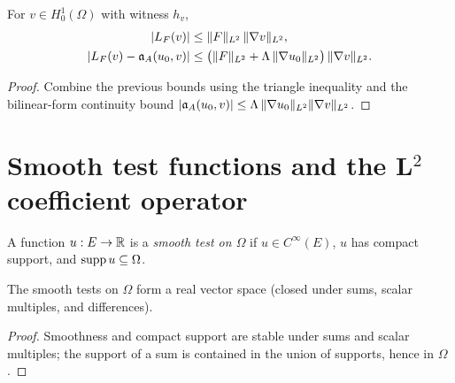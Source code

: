 \begin{lemma}
\label{lem:weakProblemRHSOfField_bound}
\leanok
{}
For $v \in H^{1}_{0}(\Omega)$ with witness $h_v$,
\begin{align*}
  |L_F(v)| &\leq \|F\|_{L^{2}} \,\|\nabla v\|_{L^{2}}, \\
  |L_F(v) - \mathfrak{a}_A(u_0, v)| &\leq \bigl(\|F\|_{L^{2}} + \Lambda\,\|\nabla u_0\|_{L^{2}}\bigr)\,\|\nabla v\|_{L^{2}}.
\end{align*}
\end{lemma}

\begin{proof}
\leanok
{}

Combine the previous bounds using the triangle inequality and the bilinear-form continuity bound $|\mathfrak{a}_A(u_0,v)| \leq \Lambda\,\|\nabla u_0\|_{L^{2}}\|\nabla v\|_{L^{2}}$.
\end{proof}

\section{Smooth test functions and the L\texorpdfstring{$^2$}{2} coefficient operator}

\begin{definition}
\label{def:IsSmoothTestOn}
\leanok
A function $u : E \to \mathbb{R}$ is a \emph{smooth test on $\Omega$} if $u \in C^{\infty}(E)$, $u$ has compact support, and $\operatorname{supp} u \subseteq \Omega$.
\end{definition}

\begin{lemma}
\label{lem:IsSmoothTestOn_zero}
\leanok
{}
The smooth tests on $\Omega$ form a real vector space (closed under sums, scalar multiples, and differences).
\end{lemma}

\begin{proof}
\leanok

Smoothness and compact support are stable under sums and scalar multiples; the support of a sum is contained in the union of supports, hence in $\Omega$.
\end{proof}

